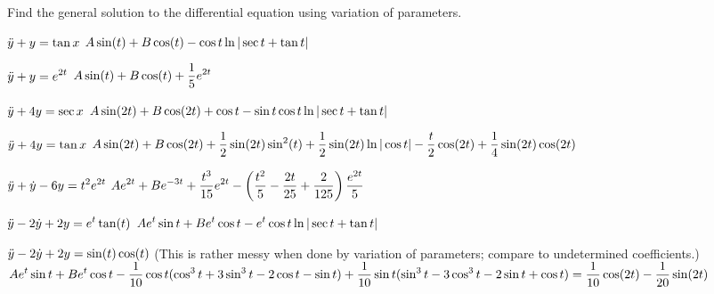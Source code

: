 \exercises

Find the general solution to the differential equation using variation
of parameters.

\exercise $\displaystyle\ddot y+y=\tan x$
\answer $\ds A\sin(t)+B\cos(t)-\hfill\break\cos t\ln|\sec t+\tan t|$
\endanswer
\endexercise

\exercise $\displaystyle\ddot y+y=e^{2t}$
\answer $\displaystyle A\sin(t)+B\cos(t)+{1\over5}e^{2t}$
\endanswer
\endexercise

\exercise $\displaystyle\ddot y+4y=\sec x$
\answer $\displaystyle A\sin(2t)+B\cos(2t)+\cos t-\sin t\cos t\ln|\sec t+\tan t|$
\endanswer
\endexercise

\exercise $\displaystyle\ddot y+4y=\tan x$
\answer $\displaystyle A\sin(2t)+B\cos(2t)+{1\over2}\sin(2t)\sin^2(t)+
{1\over2}\sin(2t)\ln|\cos t|-{t\over2}\cos(2t)+{1\over4}\sin(2t)\cos(2t)$
\endanswer
\endexercise

\exercise $\displaystyle\ddot y+\dot y-6y=t^2e^{2t}$
\answer $\displaystyle Ae^{2t}+Be^{-3t}+{t^3\over15}e^{2t}-\left({t^2\over5}
-{2t\over25}+{2\over125}\right){e^{2t}\over5}$
\endanswer
\endexercise

\exercise $\displaystyle\ddot y-2\dot y+2y=e^{t}\tan(t)$
\answer $\displaystyle Ae^{t}\sin t+Be^{t}\cos t-e^t\cos t\ln|\sec t+\tan t|$
\endanswer
\endexercise

\exercise $\displaystyle\ddot y-2\dot y+2y=\sin(t)\cos(t)$ (This is rather messy
when done by variation of parameters; compare to undetermined coefficients.)
\answer $\displaystyle Ae^{t}\sin t+Be^{t}\cos t-
{1\over10}\cos t(\cos^3 t+3\sin^3 t-2\cos t-\sin t)+
{1\over10}\sin t(\sin^3 t-3\cos^3 t-2\sin t+\cos t)=
{1\over10}\cos(2t)-{1\over20}\sin(2t)$
\endanswer
\endexercise

\endexercises
